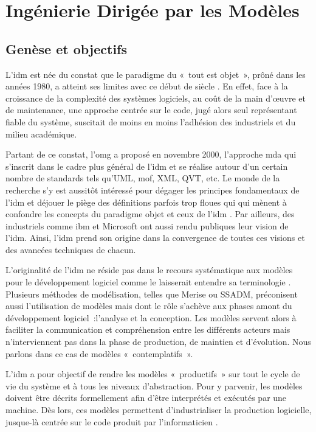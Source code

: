 \chapter{Ingénierie Dirigée par les Modèles}
\label{ch:EA}
 

\section{Genèse et objectifs}

L'\gls{idm} est née du constat que le paradigme du «~tout est objet~», prôné dans les années 1980, a atteint ses limites avec ce début de siècle \cite{greenfield2004software}. En effet, face à la croissance de la complexité des systèmes logiciels, au coût de la main d'œuvre et de maintenance, une approche centrée sur le code, jugé alors seul représentant 
fiable du système, suscitait de moins en moins l'adhésion des industriels et du 
milieu académique. 

Partant de ce constat, l'\gls{omg} a proposé en novembre 
2000, l'approche \gls{mda} qui s'inscrit dans le cadre 
plus général de l'\gls{idm} et se réalise autour d'un certain nombre de standards tels 
qu'UML, \gls{mof}, XML, QVT, etc. Le monde de la recherche s'y est aussitôt intéressé 
pour dégager les principes fondamentaux de l'\gls{idm} 
\cite{bezivin2001towards}\cite{kent2002model} \cite{de2002using} et déjouer le 
piège des définitions parfois trop floues qui qui mènent à confondre les 
concepts du paradigme objet et ceux de l'\gls{idm} \cite{bezivin2004search}. Par 
ailleurs, des industriels comme \gls{ibm} \cite{booch2004mda} et Microsoft 
\cite{greenfield2004software} ont aussi rendu publiques leur vision de l'\gls{idm}. 
Ainsi, l'\gls{idm} prend son origine dans la convergence de toutes ces visions et des 
avancées techniques de chacun.

L'originalité de l'\gls{idm} ne réside pas dans le recours systématique aux modèles 
pour le développement logiciel comme le laisserait entendre sa terminologie  
\cite{bezivin2004rapport}. Plusieurs méthodes de modélisation, telles que Merise 
ou SSADM, préconisent aussi l'utilisation de modèles mais dont le rôle s'achève aux 
phases amont du développement logiciel~:l'analyse et la conception. Les modèles 
servent alors à faciliter la communication et compréhension entre les différents 
acteurs mais n'interviennent pas dans la phase de production, de maintien et 
d'évolution. Nous parlons dans ce cas de modèles «~contemplatifs~». 

L'\gls{idm} a pour objectif de rendre les modèles «~productifs~» sur tout le cycle de 
vie du système et à tous les niveaux d'abstraction. Pour y parvenir, les modèles 
doivent être décrits formellement afin d'être interprétés et exécutés par une 
machine. Dès lors, ces modèles permettent d'industrialiser la production 
logicielle, jusque-là centrée sur le code produit par l'informaticien 
\cite{bezivin2005unification}.

